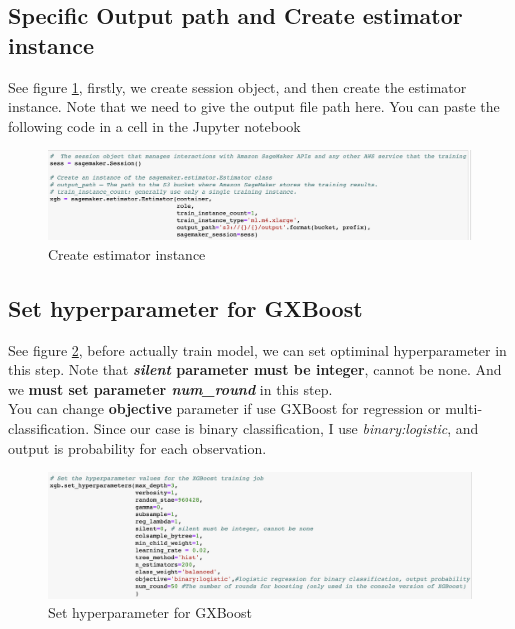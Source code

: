 \documentclass[12pt]{article}
\begin{document}
\subsection{Specific Output path and Create estimator instance}
See figure \ref{fig:create_estimator_instance}, firstly, we create session object, and then create the estimator instance. Note that we need to give the output file path here. You can paste the following code in a cell in the Jupyter notebook 
\begin{figure}[H]
\centering
\begin{minipage}{1\textwidth}
  \centering
  \includegraphics[width=1\linewidth]{create_estimator_instance.png}
   \caption{Create estimator instance}
   \label{fig:create_estimator_instance}
\end{minipage}%
\end{figure}
\noindent
 
\subsection{Set hyperparameter for GXBoost}
See figure \ref{fig:set_hypterparameter}, before actually train model, we can set optiminal hyperparameter in this step. Note that \textbf{\textit{silent} parameter must be integer}, cannot be none. And we \textbf{must set parameter \textit{num\_round}} in this step.
\\
\noindent
You can change \textbf{objective} parameter if use GXBoost for regression or multi-classification. Since our case is binary classification, I use \textit{binary:logistic}, and output is probability for each observation.

\begin{figure}[H]
\centering
\begin{minipage}{1\textwidth}
  \centering
  \includegraphics[width=1\linewidth]{set_hypterparameter.png}
   \caption{Set hyperparameter for GXBoost}
   \label{fig:set_hypterparameter}
\end{minipage}%
\end{figure}
\noindent
\end{document}
